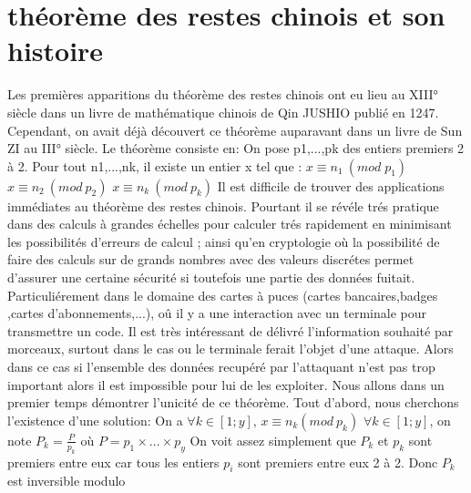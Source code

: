 \documentclass[a4paper, 11pt]{report}
\begin{document}
\section{théorème des restes chinois et son histoire}
Les premières apparitions du théorème des restes chinois ont eu lieu au XIII° siècle  dans un livre de mathématique chinois de Qin JUSHIO publié en 1247. Cependant, on avait déjà découvert ce théorème auparavant dans un livre de Sun ZI au III° siècle. Le théorème consiste en:
On pose p1,...,pk des entiers premiers 2 à 2. Pour tout n1,...,nk, il existe un entier x tel que :
\newline
\newline
$ x\equiv n_1 \: (mod \;  p_1)$ 
\newline
$ x\equiv n_2 \: (mod \: p_2)$
\newline
$ x \equiv n_k \:(mod\: p_k)$
\newline
\newline
Il est difficile de trouver des applications immédiates au théorème des restes chinois. 
Pourtant il se révéle trés pratique dans des calculs à grandes échelles pour calculer trés rapidement 
en minimisant les possibilités d'erreurs de calcul ;
 ainsi qu'en cryptologie où la possibilité de faire des calculs sur de grands nombres avec des valeurs discrétes permet d'assurer une certaine sécurité si toutefois une partie des données fuitait.
Particuliérement dans le domaine des cartes à puces (cartes bancaires,badges ,cartes d'abonnements,...), oû il y a une interaction avec un terminale pour transmettre un code.
Il est très intéressant de délivré l'information souhaité par morceaux, surtout dans le cas ou le terminale ferait l'objet d'une attaque.
Alors dans ce cas si l'ensemble des données recupéré par l'attaquant n'est pas trop important alors il est impossible pour lui de les exploiter.
\newline
\newline
\newline
\newline
Nous allons dans un premier temps démontrer l'unicité de ce théorème.
\newline
Tout d'abord, nous cherchons l'existence d'une solution: \newline
On a $\forall k \in [1;y]  $, $x\equiv n_k (mod \: p_k)$ \newline
$\forall k \in [1;y] $, on note $P_k=\frac{P}{p_k} $ où $P=p_1 \times  ... \times p_y$ \newline
On voit assez simplement que $P_k$ et $p_k$ sont premiers entre eux car tous les entiers $p_i$ sont premiers entre eux 2 à 2. Donc $P_k$ est inversible modulo 
\end{document}
